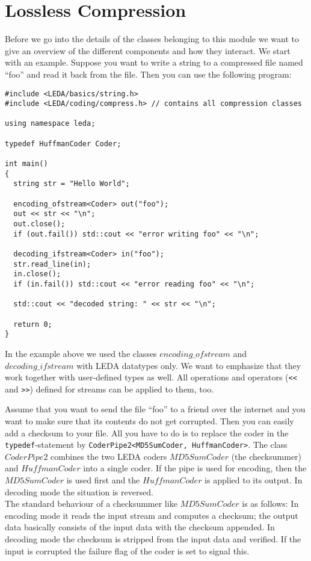 
\chapter {Lossless Compression} \label{Compression}

Before we go into the details of the classes belonging to this module we want
to give an overview of the different components and how they interact.
We start with an example. Suppose you want to write a string to a compressed 
file named ``foo'' and read it back from the file. 
Then you can use the following program:
\begin{verbatim}
#include <LEDA/basics/string.h>
#include <LEDA/coding/compress.h> // contains all compression classes

using namespace leda;

typedef HuffmanCoder Coder;

int main()
{
  string str = "Hello World";

  encoding_ofstream<Coder> out("foo");
  out << str << "\n";
  out.close();
  if (out.fail()) std::cout << "error writing foo" << "\n";

  decoding_ifstream<Coder> in("foo");
  str.read_line(in);
  in.close();
  if (in.fail()) std::cout << "error reading foo" << "\n";

  std::cout << "decoded string: " << str << "\n";

  return 0;
}
\end{verbatim}

In the example above we used the classes $\mathit{encoding\_ofstream}$ and 
$\mathit{decoding\_ifstream}$ with LEDA datatypes only. 
We want to emphasize that they work together with user-defined types as well.
All operations and operators ({\tt <<} and {\tt >>}) defined for \CC{} streams 
can be applied to them, too.

Assume that you want to send the file ``foo'' to a friend over the internet and
you want to make sure that its contents do not get corrupted. Then you can
easily add a checksum to your file. All you have to do is to replace the coder
in the {\tt typedef}-statement by {\tt CoderPipe2<MD5SumCoder, HuffmanCoder>}.
The class $\mathit{CoderPipe2}$ combines the two LEDA coders
$\mathit{MD5SumCoder}$ (the checksummer) and $\mathit{HuffmanCoder}$ into a 
single coder. 
If the pipe is used for encoding, then the $\mathit{MD5SumCoder}$ is used
first and the $\mathit{HuffmanCoder}$ is applied to its output. In decoding
mode the situation is reversed.\\
The standard behaviour of a checksummer like $\mathit{MD5SumCoder}$ is as 
follows: In encoding mode it reads the input stream and computes a checksum;
the output data basically consists of the input data with the checksum
appended. 
In decoding mode the checksum is stripped from the input data and verified.
If the input is corrupted the failure flag of the coder is set to signal 
this.

